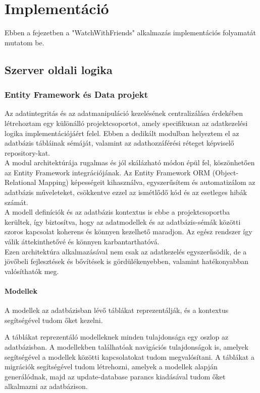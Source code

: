 \chapter{Implement\'aci\'o}\label{chapter:implementation}
Ebben a fejezetben a "WatchWithFriends" alkalmazás implementációs folyamatát mutatom be.
\section{Szerver oldali logika}
\subsection{Entity Framework és Data projekt}
Az adatintegritás és az adatmanipuláció kezelésének centralizálása érdekében létrehoztam egy különálló projektcsoportot, amely specifikusan az adatkezelési logika implementációjáért felel. Ebben a dedikált modulban helyeztem el az adatbázis tábláinak sémáját, valamint az adathozzáférési réteget képviselő repository-kat.
\\
A modul architektúrája rugalmas és jól skálázható módon épül fel, köszönhetően az Entity Framework integrációjának. Az Entity Framework ORM (Object-Relational Mapping) képességeit kihasználva, egyszerűsítem és automatizálom az adatbázis műveleteket, csökkentve ezzel az ismétlődő kód és az esetleges hibák számát.
\\
A modell definíciók és az adatbázis kontextus is ebbe a projektcsoportba kerültek, így biztosítva, hogy az adatmodellek és az adatbázis-sémák közötti szoros kapcsolat koherens és könnyen kezelhető maradjon. Az egész rendszer így válik áttekinthetővé és könnyen karbantarthatóvá.
\\
Ezen architektúra alkalmazásával nem csak az adatkezelés egyszerűsödik, de a jövőbeli fejlesztések és bővítések is gördülékenyebben, valamint hatékonyabban valósíthatók meg.
\subsubsection{Modellek}
A modellek az adatbázisban lévő táblákat reprezentálják, és a kontextus segítségével tudom őket kezelni.

A táblákat reprezentáló modelleknek minden tulajdonsága egy oszlop az adatbázisban.
A modellekben találhatóak navigációs tulajdonságok is, amelyek segítségével a modellek közötti kapcsolatokat tudom megvalósítani.
A táblákat a migrációk segítségével tudom létrehozni, amelyek a modellek alapján generálódnak, majd az update-database parancs kiadásával tudom őket alkalmazni az adatbázison.

